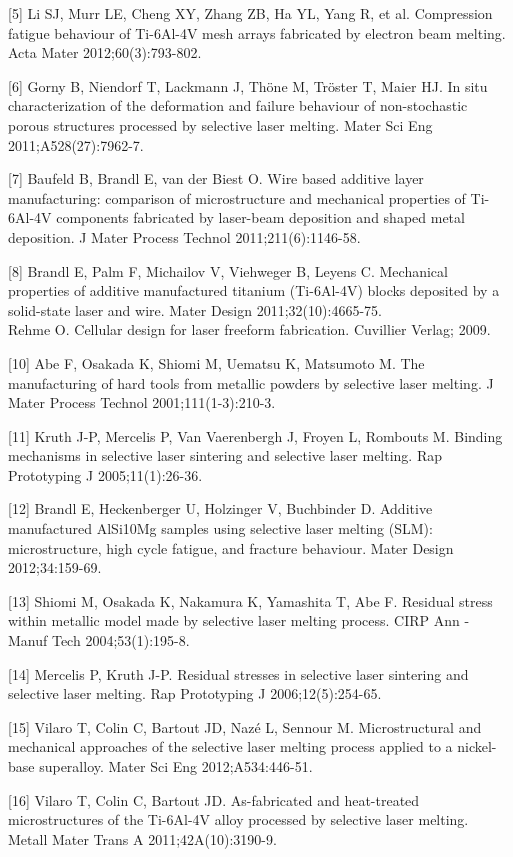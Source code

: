 \documentclass[10pt]{article}
\begin{document}
[5] Li SJ, Murr LE, Cheng XY, Zhang ZB, Ha YL, Yang R, et al. Compression fatigue behaviour of Ti-6Al-4V mesh arrays fabricated by electron beam melting. Acta Mater 2012;60(3):793-802.

[6] Gorny B, Niendorf T, Lackmann J, Thöne M, Tröster T, Maier HJ. In situ characterization of the deformation and failure behaviour of non-stochastic porous structures processed by selective laser melting. Mater Sci Eng 2011;A528(27):7962-7.

[7] Baufeld B, Brandl E, van der Biest O. Wire based additive layer manufacturing: comparison of microstructure and mechanical properties of Ti-6Al-4V components fabricated by laser-beam deposition and shaped metal deposition. J Mater Process Technol 2011;211(6):1146-58.

[8] Brandl E, Palm F, Michailov V, Viehweger B, Leyens C. Mechanical properties of additive manufactured titanium (Ti-6Al-4V) blocks deposited by a solid-state laser and wire. Mater Design 2011;32(10):4665-75.\\
[9] Rehme O. Cellular design for laser freeform fabrication. Cuvillier Verlag; 2009.

[10] Abe F, Osakada K, Shiomi M, Uematsu K, Matsumoto M. The manufacturing of hard tools from metallic powders by selective laser melting. J Mater Process Technol 2001;111(1-3):210-3.

[11] Kruth J-P, Mercelis P, Van Vaerenbergh J, Froyen L, Rombouts M. Binding mechanisms in selective laser sintering and selective laser melting. Rap Prototyping J 2005;11(1):26-36.

[12] Brandl E, Heckenberger U, Holzinger V, Buchbinder D. Additive manufactured AlSi10Mg samples using selective laser melting (SLM): microstructure, high cycle fatigue, and fracture behaviour. Mater Design 2012;34:159-69.

[13] Shiomi M, Osakada K, Nakamura K, Yamashita T, Abe F. Residual stress within metallic model made by selective laser melting process. CIRP Ann - Manuf Tech 2004;53(1):195-8.

[14] Mercelis P, Kruth J-P. Residual stresses in selective laser sintering and selective laser melting. Rap Prototyping J 2006;12(5):254-65.

[15] Vilaro T, Colin C, Bartout JD, Nazé L, Sennour M. Microstructural and mechanical approaches of the selective laser melting process applied to a nickel-base superalloy. Mater Sci Eng 2012;A534:446-51.

[16] Vilaro T, Colin C, Bartout JD. As-fabricated and heat-treated microstructures of the Ti-6Al-4V alloy processed by selective laser melting. Metall Mater Trans A 2011;42A(10):3190-9.
\end{document}
